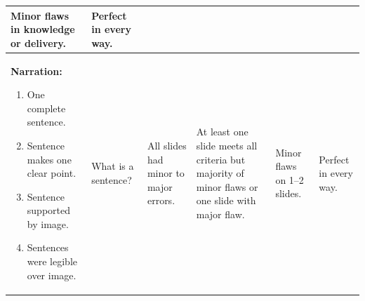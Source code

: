 \documentclass[10pt]{article}
\begin{document}
\begin{landscape}
{\begin{longtable}[l]{@{}L{7cm}L{3cm}L{3cm}L{3cm}L{3cm}L{3cm}@{}}
Minor flaws in knowledge or delivery.&%
Perfect in every way.%
\\[-1em]
\midrule
\textbf{Narration:}\par%
\vspace{-0.5\baselineskip}
\begin{enumerate}[itemsep=-0.25\baselineskip,align=left, leftmargin=*]
\item One complete sentence. %
\item Sentence makes one clear point.%
\item Sentence supported by image.%
\item Sentences were legible over image.
\end{enumerate}&%
What is a sentence? &%
All slides had minor to major errors. &%
At least one slide meets all criteria but majority of minor flaws or one slide with major flaw. &%
Minor flaws on 1–2 slides.&%
Perfect in every way.%
\\[-1em]
\midrule


\end{longtable}}
\end{landscape}
\end{document}
